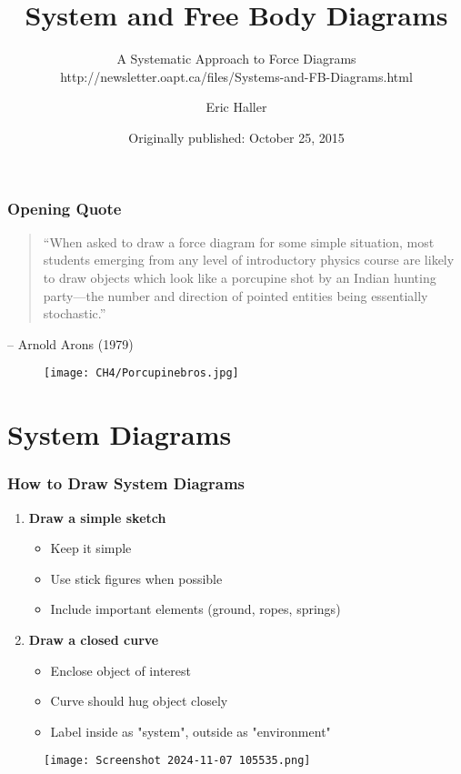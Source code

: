 \documentclass{beamer}
\title[System \& Free Body Diagrams]{System and Free Body Diagrams}
\subtitle{A Systematic Approach to Force Diagrams\\http://newsletter.oapt.ca/files/Systems-and-FB-Diagrams.html}
\author[E. Haller]{Eric Haller}
\date[2015]{Originally published: October 25, 2015}
\begin{document}
\frame{\titlepage}

\begin{frame}
\frametitle{Opening Quote}
\begin{quote}
``When asked to draw a force diagram for some simple situation, most students emerging from any level of introductory physics course are likely to draw objects which look like a porcupine shot by an Indian hunting party—the number and direction of pointed entities being essentially stochastic.''
\end{quote}
\vspace{0.5cm}
\hfill -- Arnold Arons (1979)
\begin{figure}[H]
    \centering
    \texttt{[image: CH4/Porcupinebros.jpg]}
\end{figure}
\end{frame}

\section{System Diagrams}

\begin{frame}
\frametitle{How to Draw System Diagrams}
\begin{enumerate}
    \item \textbf{Draw a simple sketch}
    \begin{itemize}
        \item Keep it simple
        \item Use stick figures when possible
        \item Include important elements (ground, ropes, springs)
    \end{itemize}
    \item \textbf{Draw a closed curve}
    \begin{itemize}
        \item Enclose object of interest
        \item Curve should hug object closely
        \item Label inside as "system", outside as "environment"
    \end{itemize}
\end{enumerate}
\begin{figure}
    \centering
    \texttt{[image: Screenshot 2024-11-07 105535.png]}
\end{figure}

\end{frame}
\end{document}

